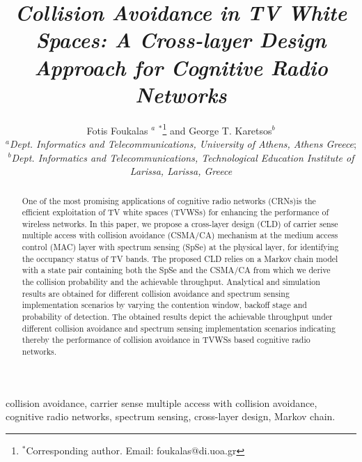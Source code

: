 \documentclass
[journal,11pt,draftclsnofoot,onecolumn,doublespace]{tETN2e}
\begin{document}
\title{{\itshape Collision Avoidance in TV White Spaces: A Cross-layer Design Approach for Cognitive Radio Networks } }

\author{Fotis Foukalas $^{a}$ $^{\ast}$\thanks{$^\ast $Corresponding author. Email: foukalas@di.uoa.gr \vspace{6pt}} and George T. Karetsos$^{b}$\\\vspace{6pt} $^{a}${\em{Dept. Informatics and  Telecommunications, University of Athens, Athens Greece}}; \\
$^{b}${\em{Dept. Informatics and Telecommunications, Technological Education Institute of Larissa, Larissa, Greece}}\\\vspace{6pt} }

\maketitle
\begin{abstract}
One of the most promising applications of cognitive radio networks (CRNs)is the efficient exploitation of TV white spaces (TVWSs) for enhancing the performance of wireless networks. In this paper, we propose a cross-layer design (CLD) of  carrier sense multiple access with collision avoidance (CSMA/CA) mechanism at the medium access control (MAC) layer with spectrum sensing (SpSe) at the physical layer, for identifying the occupancy status of TV bands. The proposed CLD relies on a Markov chain model with a state pair containing both the SpSe and the CSMA/CA from which we derive the collision probability and the achievable throughput. Analytical and simulation  results are obtained for different collision avoidance and spectrum sensing implementation scenarios  by varying the contention window, backoff stage and probability of detection. The obtained results depict the achievable throughput under different collision avoidance and spectrum sensing implementation scenarios indicating thereby the performance of collision avoidance in TVWSs based cognitive radio networks. 
\end{abstract}

\begin{keywords}
collision avoidance, carrier sense multiple access with collision avoidance, cognitive radio networks, spectrum sensing, cross-layer design, Markov chain. 
\end{keywords}
   
\end{document}

